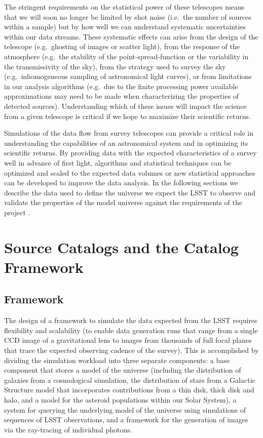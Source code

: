\documentclass[]{article}
\begin{document}
{The stringent requirements on the statistical power of these
telescopes means that we will soon no longer be limited by shot noise
(i.e.\ the number of sources within a sample) but by how well we can
understand systematic uncertainties within our data streams. These
systematic effects can arise from the design of the telescope
(e.g.\ ghosting of images or scatter light), from the response of the
atmosphere (e.g.\ the stability of the point-spread-function or the
variability in the transmissivity of the sky), from the strategy used
to survey the sky (e.g.\ inhomogeneous sampling of astronomical light
curves), or from limitations in our analysis algorithms (e.g.\ due to
the finite processing power available approximations may need to be
made when characterizing the properties of detected
sources). Understanding which of these issues will impact the science
from a given telescope is critical if we hope to maximize their
scientific returns.

Simulations of the data flow from survey telescopes can provide a
critical role in understanding the capabilities of an astronomical
system and in optimizing its scientific returns. By providing data
with the expected characteristics of a survey well in advance of first
light, algorithms and statistical techniques can be optimized and
scaled to the expected data volumes or new statistical approaches can
be developed to improve the data analysis. 
In the following sections we describe the data used to define the universe
we expect the LSST to observe and validate the properties of the model
universe against the requirements of the project \citep{requirements}.

\section{Source Catalogs and the Catalog Framework}

\subsection{Framework}


The design of a framework \citet{connolly10} to simulate the data
expected from the LSST requires flexibility and scalability (to enable
data generation runs that range from a single CCD image of a
gravitational lens to images from thousands of full focal planes that
trace the expected observing cadence of the survey). This is
accomplished by dividing the simulation workload into three separate
components: a base component that stores a model of the universe
(including the distribution of galaxies from a cosmological
simulation, the distribution of stars from a Galactic Structure model
that incorporates contributions from a thin disk, thick disk and halo,
and a model for the asteroid populations within our Solar System), a
system for querying the underlying model of the universe using
simulations of sequences of LSST observations, and a framework for the
generation of images via the ray-tracing of individual photons. 


}
\end{document}
